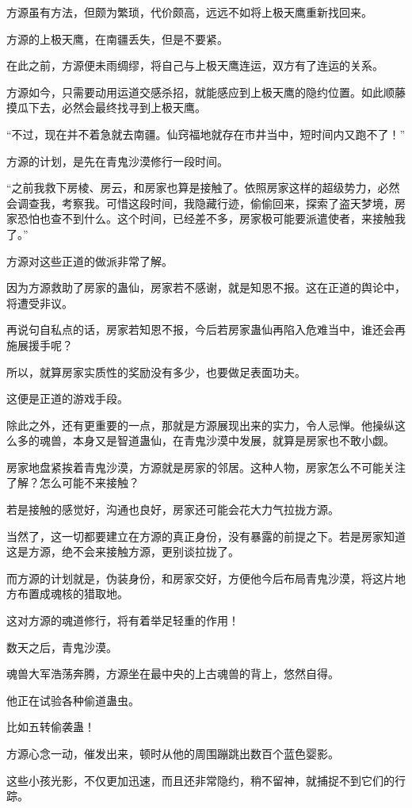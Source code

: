 \begin{this_body}
方源虽有方法，但颇为繁琐，代价颇高，远远不如将上极天鹰重新找回来。

方源的上极天鹰，在南疆丢失，但是不要紧。

在此之前，方源便未雨绸缪，将自己与上极天鹰连运，双方有了连运的关系。

方源如今，只需要动用运道交感杀招，就能感应到上极天鹰的隐约位置。如此顺藤摸瓜下去，必然会最终找寻到上极天鹰。

“不过，现在并不着急就去南疆。仙窍福地就存在市井当中，短时间内又跑不了！”

方源的计划，是先在青鬼沙漠修行一段时间。

“之前我救下房棱、房云，和房家也算是接触了。依照房家这样的超级势力，必然会调查我，考察我。可惜这段时间，我隐藏行迹，偷偷回来，探索了盗天梦境，房家恐怕也查不到什么。这个时间，已经差不多，房家极可能要派遣使者，来接触我了。”

方源对这些正道的做派非常了解。

因为方源救助了房家的蛊仙，房家若不感谢，就是知恩不报。这在正道的舆论中，将遭受非议。

再说句自私点的话，房家若知恩不报，今后若房家蛊仙再陷入危难当中，谁还会再施展援手呢？

所以，就算房家实质性的奖励没有多少，也要做足表面功夫。

这便是正道的游戏手段。

除此之外，还有更重要的一点，那就是方源展现出来的实力，令人忌惮。他操纵这么多的魂兽，本身又是智道蛊仙，在青鬼沙漠中发展，就算是房家也不敢小觑。

房家地盘紧挨着青鬼沙漠，方源就是房家的邻居。这种人物，房家怎么不可能关注了解？怎么可能不来接触？

若是接触的感觉好，沟通也良好，房家还可能会花大力气拉拢方源。

当然了，这一切都要建立在方源的真正身份，没有暴露的前提之下。若是房家知道这是方源，绝不会来接触方源，更别谈拉拢了。

而方源的计划就是，伪装身份，和房家交好，方便他今后布局青鬼沙漠，将这片地方布置成魂核的猎取地。

这对方源的魂道修行，将有着举足轻重的作用！

数天之后，青鬼沙漠。

魂兽大军浩荡奔腾，方源坐在最中央的上古魂兽的背上，悠然自得。

他正在试验各种偷道蛊虫。

比如五转偷袭蛊！

方源心念一动，催发出来，顿时从他的周围蹦跳出数百个蓝色婴影。

这些小孩光影，不仅更加迅速，而且还非常隐约，稍不留神，就捕捉不到它们的行踪。


\end{this_body}
